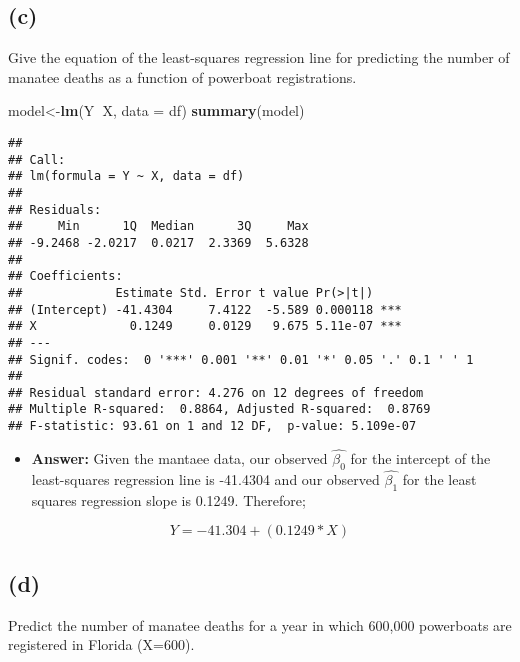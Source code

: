 \documentclass[]{article}
\newenvironment{Shaded}{\begin{snugshade}}{\end{snugshade}}
\newcommand{\KeywordTok}[1]{\textcolor[rgb]{0.13,0.29,0.53}{\textbf{#1}}}
\newcommand{\DataTypeTok}[1]{\textcolor[rgb]{0.13,0.29,0.53}{#1}}
\newcommand{\DecValTok}[1]{\textcolor[rgb]{0.00,0.00,0.81}{#1}}
\newcommand{\FloatTok}[1]{\textcolor[rgb]{0.00,0.00,0.81}{#1}}
\newcommand{\StringTok}[1]{\textcolor[rgb]{0.31,0.60,0.02}{#1}}
\newcommand{\OperatorTok}[1]{\textcolor[rgb]{0.81,0.36,0.00}{\textbf{#1}}}
\newcommand{\NormalTok}[1]{#1}
\providecommand{\tightlist}{%
  \setlength{\itemsep}{0pt}\setlength{\parskip}{0pt}}
\begin{document}
\subsection{(c)}\label{c-4}

Give the equation of the least-squares regression line for predicting
the number of manatee deaths as a function of powerboat registrations.

\begin{Shaded}
\begin{Highlighting}[]
\NormalTok{model<-}\KeywordTok{lm}\NormalTok{(Y}\OperatorTok{~}\NormalTok{X, }\DataTypeTok{data =}\NormalTok{ df)}
\KeywordTok{summary}\NormalTok{(model)}
\end{Highlighting}
\end{Shaded}

\begin{verbatim}
## 
## Call:
## lm(formula = Y ~ X, data = df)
## 
## Residuals:
##     Min      1Q  Median      3Q     Max 
## -9.2468 -2.0217  0.0217  2.3369  5.6328 
## 
## Coefficients:
##             Estimate Std. Error t value Pr(>|t|)    
## (Intercept) -41.4304     7.4122  -5.589 0.000118 ***
## X             0.1249     0.0129   9.675 5.11e-07 ***
## ---
## Signif. codes:  0 '***' 0.001 '**' 0.01 '*' 0.05 '.' 0.1 ' ' 1
## 
## Residual standard error: 4.276 on 12 degrees of freedom
## Multiple R-squared:  0.8864, Adjusted R-squared:  0.8769 
## F-statistic: 93.61 on 1 and 12 DF,  p-value: 5.109e-07
\end{verbatim}

\begin{itemize}
\tightlist
\item
  \textbf{Answer:} Given the mantaee data, our observed
  \(\hat{\beta_0}\) for the intercept of the least-squares regression
  line is -41.4304 and our observed \(\hat{\beta_1}\) for the least
  squares regression slope is 0.1249. Therefore;
\end{itemize}

\[
Y = -41.304 + (0.1249 * X)
\]

\subsection{(d)}\label{d-4}

Predict the number of manatee deaths for a year in which 600,000
powerboats are registered in Florida (X=600).

\begin{Shaded}
\end{Shaded}
\end{document}
